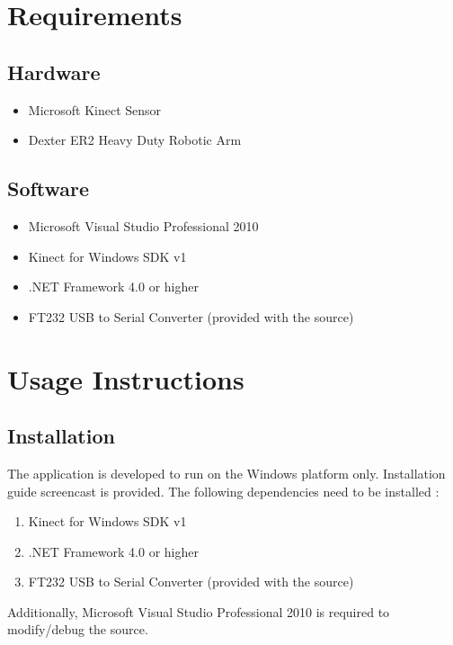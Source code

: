\documentclass[a4paper,11pt]{article}
\begin{document}
\section{Requirements}
\subsection{Hardware}
\begin{itemize}
\item Microsoft Kinect Sensor
\item Dexter ER2 Heavy Duty Robotic Arm
\end{itemize}

\subsection{Software}
\begin{itemize}
\item Microsoft Visual Studio Professional 2010
\item Kinect for Windows SDK v1
\item .NET Framework 4.0 or higher
\item FT232 USB to Serial Converter (provided with the source)
\end{itemize}

\section{Usage Instructions}
\subsection{Installation}
The application is developed to run on the Windows platform only. Installation guide screencast is provided. The following dependencies need to be installed :
\begin{enumerate}
\item Kinect for Windows SDK v1
\item .NET Framework 4.0 or higher
\item FT232 USB to Serial Converter (provided with the source)
\end{enumerate}

Additionally, Microsoft Visual Studio Professional 2010 is required to modify/debug the source.
\end{document}
